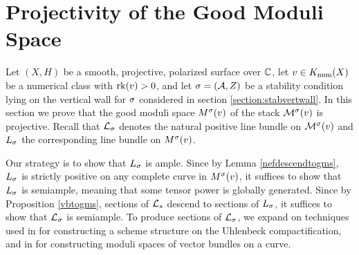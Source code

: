 \documentclass[letterpaper,11pt]{amsart}%
\theoremstyle{remark}
\begin{document}


\iffalse
\section{Projectivity of the Good Moduli Space}
Let $(X, H)$ be a smooth, projective, polarized surface over $\mathbb{C}$, let $v \in K_{\mathrm{num}}(X)$ be a numerical class with $\operatorname{\mathrm{rk}}(v) > 0$, and let $\sigma = (\mathcal{A}, Z)$ be a stability condition lying on the vertical wall for $\sigma$ considered in section \ref{section:stabvertwall}. In this section we prove that the good moduli space $M^\sigma(v)$ of the stack $\mathcal{M}^\sigma(v)$ is projective. Recall that $\mathcal{L}_\sigma$ denotes the natural positive line bundle on $\mathcal{M}^\sigma(v)$ and $L_\sigma$ the corresponding line bundle on $M^\sigma(v)$. 

Our strategy is to show that $L_\sigma$ is ample. Since by Lemma \ref{nefdescendtogms}, $L_\sigma$ is strictly positive on any complete curve in $M^\sigma(v)$, it suffices to show that $L_\sigma$ is semiample, meaning that some tensor power is globally generated. Since by Proposition \ref{vbtogms}, sections of $\mathcal{L}_s$ descend to sections of $L_\sigma$, it suffices to show that $\mathcal{L}_\sigma$ is semiample. To produce sections of $\mathcal{L}_\sigma$, we expand on techniques used in \cite{li} for constructing a scheme structure on the Uhlenbeck compactification, and in \cite{seshadri} for constructing moduli spaces of vector bundles on a curve. 
\end{document}
